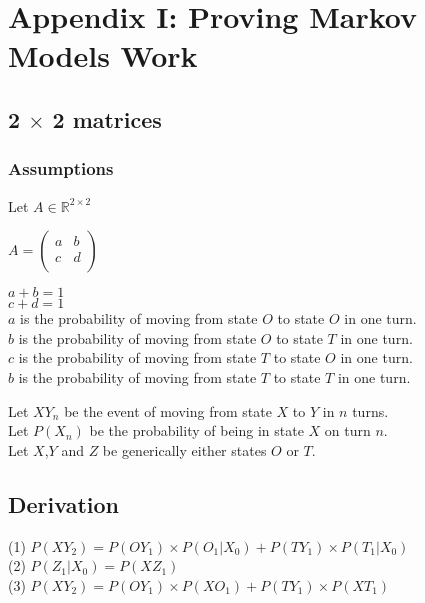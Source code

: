 \section{Appendix I: Proving Markov Models Work}
\subsection{2 $\times$ 2 matrices}
\subsubsection{Assumptions}

Let $A \in \mathbb{R}^{2\times2}$

$A =
\begin{pmatrix}
  a & b\\
  c & d\\
\end{pmatrix}
$

$a+b=1$\\
$c+d=1$\\
$a$ is the probability of moving from state $O$ to state $O$ in one turn.\\
$b$ is the probability of moving from state $O$ to state $T$ in one turn.\\
$c$ is the probability of moving from state $T$ to state $O$ in one turn.\\
$b$ is the probability of moving from state $T$ to state $T$ in one turn.

Let $XY_n$ be the event of moving from state $X$ to $Y$ in $n$ turns. \\
Let $P(X_n)$ be the probability of being in state $X$ on turn $n$.\\
Let $X$,$Y$ and $Z$ be generically either states $O$ or $T$.

\subsection{Derivation}

(1) $P(XY_2) = P(OY_1) \times P(O_1|X_0)+P(TY_1) \times P(T_1|X_0)$\\
(2) $P(Z_1|X_0) = P(XZ_1)$\\
(3) $P(XY_2) = P(OY_1) \times P(XO_1)+P(TY_1) \times P(XT_1)$

